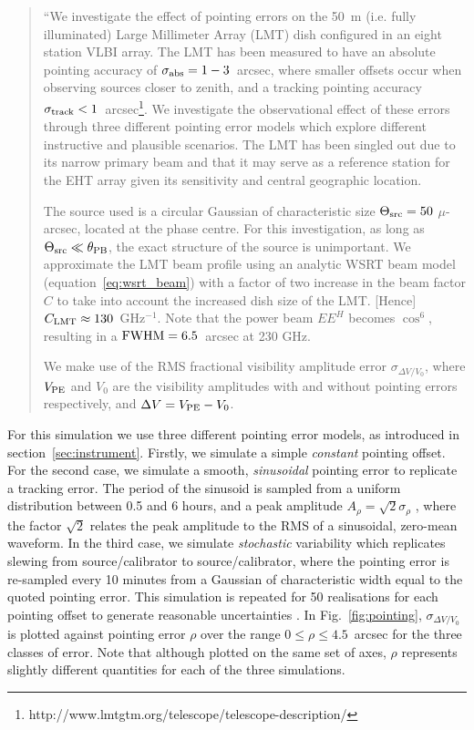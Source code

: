\begin{quotation}
``We investigate the effect of pointing errors on the 50~m (i.e. fully illuminated) Large Millimeter Array (LMT) dish configured in an eight station VLBI array. The LMT has been measured to have an absolute pointing accuracy of $\sigma_{\rm abs} = 1-3$~arcsec, where smaller offsets occur when observing sources closer to zenith, and a tracking pointing accuracy $\sigma_{\rm track} < 1$~arcsec\footnote{http://www.lmtgtm.org/telescope/telescope-description/}. We investigate the observational effect of these errors through three different pointing error models which explore different instructive and plausible scenarios. The LMT has been singled out due to its narrow primary beam and that it may serve as a reference station for the EHT array given its sensitivity and central geographic location. 

The source used is a circular Gaussian of characteristic size $\Theta_{\rm src}=50$ $\mu$-arcsec, located at the phase centre. For this investigation, as long as $\Theta_{\rm src} \ll \theta_{\rm PB}$, the exact structure of the source is unimportant. We approximate the LMT beam profile using an analytic WSRT beam model (equation~\ref{eq:wsrt_beam}) with a factor of two increase in the beam factor $C$ to take into account the increased dish size of the LMT. [Hence] $C_{\rm LMT} \approx 130$~GHz$^{-1}$. Note that the power beam $EE^H$ becomes $\cos^6$, resulting in a $\rm{FWHM} = 6.5 $~arcsec at 230 GHz.


We make use of the RMS fractional visibility amplitude error $\sigma_{\Delta V/V_0}$, where $V_{\rm PE}$ and $V_{0}$ are the visibility amplitudes with and without pointing errors respectively, and  $\Delta V = V_{\rm PE} - V_{0}$.
\\
\citep{Blecher_2016}
\end{quotation}

For this simulation we use three different pointing error models, as introduced in section~\ref{sec:instrument}. Firstly, we simulate a simple \emph{constant} pointing offset. For the second case, we simulate a smooth, \emph{sinusoidal} pointing error to replicate a tracking error. The period of the sinusoid is sampled from a uniform distribution between 0.5 and 6 hours, and a peak amplitude $A_{\rho} = \sqrt{2} \sigma_{\rho}$ , where the factor $\sqrt{2}$ relates the peak amplitude to the RMS of a sinusoidal, zero-mean waveform.  In the third case, we simulate \emph{stochastic} variability which replicates slewing from source/calibrator to source/calibrator, where the pointing error is re-sampled every 10 minutes from a Gaussian of characteristic width equal to the quoted pointing error. This simulation is repeated for 50 realisations for each pointing offset to generate reasonable uncertainties \citep{Blecher_2016}. In Fig.~\ref{fig:pointing}, $\sigma_{\Delta V/V_0}$ is plotted against pointing error $\rho$ over the range $0 \le \rho \le 4.5$~arcsec for the three classes of error. Note that although plotted on the same set of axes, $\rho$ represents slightly different quantities for each of the three simulations.

